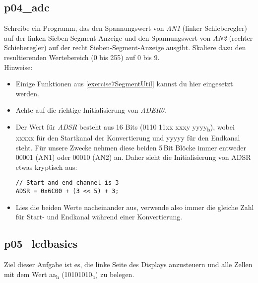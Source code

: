\subsection{p04\_adc}
Schreibe ein Programm, das den Spannungswert von \emph{AN1} (linker Schieberegler) auf der linken Sieben-Segment-Anzeige und den Spannungswert von \emph{AN2} (rechter Schieberegler) auf der recht Sieben-Segment-Anzeige ausgibt.
Skaliere dazu den resultierenden Wertebereich (0 bis 255) auf 0 bis 9.\\
Hinweise:
\begin{itemize}
\item Einige Funktionen aus \ref{exercise7SegmentUtil} kannst du hier eingesetzt werden.

\item Achte auf die richtige Initialisierung von \textit{ADER0}.

\item Der Wert für \textit{ADSR} besteht aus 16 Bits (0110 11xx xxxy yyyy\textsubscript{b}), wobei xxxxx für den Startkanal der Konvertierung und yyyyy für den Endkanal steht. Für unsere Zwecke nehmen diese beiden 5\,Bit Blöcke immer entweder 00001 (AN1) oder 00010 (AN2) an.
Daher sieht die Initialisierung von ADSR etwas kryptisch aus:
\begin{verbatim}
// Start and end channel is 3
ADSR = 0x6C00 + (3 << 5) + 3;
\end{verbatim}

\item
Lies die beiden Werte nacheinander aus, verwende also immer die gleiche Zahl für Start- und Endkanal während einer Konvertierung.

\end{itemize}

\subsection{p05\_lcdbasics}
Ziel dieser Aufgabe ist es, die linke Seite des Displays anzusteuern und alle Zellen mit dem Wert aa\textsubscript{h} (10101010\textsubscript{b}) zu belegen.

